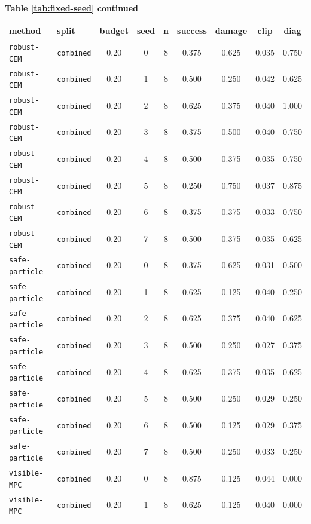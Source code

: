 \documentclass{article}
\begin{document}
\begin{center}
\textbf{Table \ref{tab:fixed-seed} continued}\\[0.4ex]
\begin{tabular}{llccccccc}
\toprule
method & split & budget & seed & n & success & damage & clip & diag \\
\midrule
\texttt{robust-CEM} & \texttt{combined} & 0.20 & 0 & 8 & 0.375 & 0.625 & 0.035 & 0.750 \\
\texttt{robust-CEM} & \texttt{combined} & 0.20 & 1 & 8 & 0.500 & 0.250 & 0.042 & 0.625 \\
\texttt{robust-CEM} & \texttt{combined} & 0.20 & 2 & 8 & 0.625 & 0.375 & 0.040 & 1.000 \\
\texttt{robust-CEM} & \texttt{combined} & 0.20 & 3 & 8 & 0.375 & 0.500 & 0.040 & 0.750 \\
\texttt{robust-CEM} & \texttt{combined} & 0.20 & 4 & 8 & 0.500 & 0.375 & 0.035 & 0.750 \\
\texttt{robust-CEM} & \texttt{combined} & 0.20 & 5 & 8 & 0.250 & 0.750 & 0.037 & 0.875 \\
\texttt{robust-CEM} & \texttt{combined} & 0.20 & 6 & 8 & 0.375 & 0.375 & 0.033 & 0.750 \\
\texttt{robust-CEM} & \texttt{combined} & 0.20 & 7 & 8 & 0.500 & 0.375 & 0.035 & 0.625 \\
\texttt{safe-particle} & \texttt{combined} & 0.20 & 0 & 8 & 0.375 & 0.625 & 0.031 & 0.500 \\
\texttt{safe-particle} & \texttt{combined} & 0.20 & 1 & 8 & 0.625 & 0.125 & 0.040 & 0.250 \\
\texttt{safe-particle} & \texttt{combined} & 0.20 & 2 & 8 & 0.625 & 0.375 & 0.040 & 0.625 \\
\texttt{safe-particle} & \texttt{combined} & 0.20 & 3 & 8 & 0.500 & 0.250 & 0.027 & 0.375 \\
\texttt{safe-particle} & \texttt{combined} & 0.20 & 4 & 8 & 0.625 & 0.375 & 0.035 & 0.625 \\
\texttt{safe-particle} & \texttt{combined} & 0.20 & 5 & 8 & 0.500 & 0.250 & 0.029 & 0.250 \\
\texttt{safe-particle} & \texttt{combined} & 0.20 & 6 & 8 & 0.500 & 0.125 & 0.029 & 0.375 \\
\texttt{safe-particle} & \texttt{combined} & 0.20 & 7 & 8 & 0.500 & 0.250 & 0.033 & 0.250 \\
\texttt{visible-MPC} & \texttt{combined} & 0.20 & 0 & 8 & 0.875 & 0.125 & 0.044 & 0.000 \\
\texttt{visible-MPC} & \texttt{combined} & 0.20 & 1 & 8 & 0.625 & 0.125 & 0.040 & 0.000 \\

\end{tabular}
\end{center}
\end{document}
